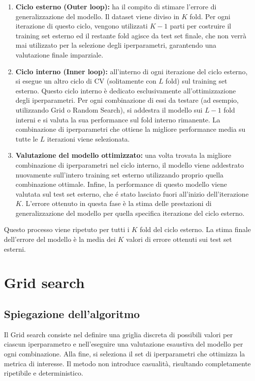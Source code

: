 \documentclass[a4paper,12pt]{report}
\begin{document}
	\begin{enumerate}
		\item \textbf{Ciclo esterno (Outer loop):} ha il compito di stimare l'errore di generalizzazione del modello. Il dataset viene diviso in $K$ fold. Per ogni iterazione di questo ciclo, vengono utilizzati $K-1$ parti per costruire il training set esterno ed il restante fold agisce da test set finale, che non verrà mai utilizzato per la selezione degli iperparametri, garantendo una valutazione finale imparziale.
		\item \textbf{Ciclo interno (Inner loop):} all'interno di ogni iterazione del ciclo esterno, si esegue un altro ciclo di CV (solitamente con $L$ fold) sul training set esterno. Questo ciclo interno è dedicato esclusivamente all'ottimizzazione degli iperparametri. Per ogni combinazione di essi da testare (ad esempio, utilizzando Grid o Random Search), si addestra il modello sui $L-1$ fold interni e si valuta la sua performance sul fold interno rimanente. La combinazione di iperparametri che ottiene la migliore performance media su tutte le $L$ iterazioni viene selezionata.
		\item \textbf{Valutazione del modello ottimizzato:} una volta trovata la migliore combinazione di iperparametri nel ciclo interno, il modello viene addestrato nuovamente sull'intero training set esterno utilizzando proprio quella combinazione ottimale. Infine, la performance di questo modello viene valutata sul test set esterno, che é stato lasciato fuori all'inizio dell'iterazione $K$. L'errore ottenuto in questa fase è la stima delle prestazioni di generalizzazione del modello per quella specifica iterazione del ciclo esterno.
	\end{enumerate}
	
	Questo processo viene ripetuto per tutti i $K$ fold del ciclo esterno. La stima finale dell'errore del modello è la media dei $K$ valori di errore ottenuti sui test set esterni.
	
	\section{Grid search}
	
	\subsection{Spiegazione dell'algoritmo}
	Il Grid search consiste nel definire una griglia discreta di possibili valori per ciascun iperparametro e nell'eseguire una valutazione esaustiva del modello per ogni combinazione. Alla fine, si seleziona il set di iperparametri che ottimizza la metrica di interesse. Il metodo non introduce casualità, risultando completamente ripetibile e deterministico.
	
\end{document}
